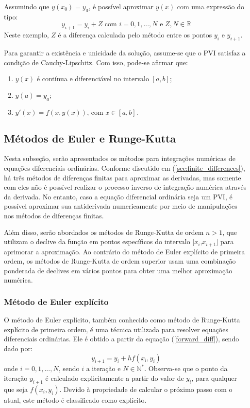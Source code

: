 Assumindo que $y(x_0) = y_0$, é possível aproximar $y(x)$ com uma expressão do tipo:
\begin{equation*}
y_{i+1} = y_i + Z \text{ com } i = 0, 1, ..., N \text{ e } Z, N \in \mathbb{R}
\end{equation*}
Neste exemplo, $Z$ é a diferença calculada pelo método entre os pontos $y_i$ e $y_{i+1}$.

Para garantir a existência e unicidade da solução, assume-se que o PVI satisfaz a condição de Cauchy-Lipschitz. Com isso, pode-se afirmar que:
\begin{enumerate}
\item $y(x)$ é contínua e diferenciável no intervalo $[a, b]$;
\item $y(a) = y_a$;
\item $y'(x) = f(x, y(x))$, com $x \in [a, b]$.
\end{enumerate}

\subsection{Métodos de Euler e Runge-Kutta}\label{sec:ivp_methods}
Nesta subseção, serão apresentados os métodos para integrações numéricas de equações diferenciais ordinárias. Conforme discutido em (\ref{sec:finite_differences}), há três métodos de diferenças finitas para aproximar as derivadas, mas somente com eles não é possível realizar o processo inverso de integração numérica através da derivada. No entanto, caso a equação diferencial ordinária seja um PVI, é possível aproximar sua antiderivada numericamente por meio de manipulações nos métodos de diferenças finitas.

Além disso, serão abordados os métodos de Runge-Kutta de ordem $n>1$, que utilizam o declive da função em pontos específicos do intervalo [$x_i$,$x_{i+1}$] para aprimorar a aproximação. Ao contrário do método de Euler explícito de primeira ordem, os métodos de Runge-Kutta de ordem superior usam uma combinação ponderada de declives em vários pontos para obter uma melhor aproximação numérica. 


\subsubsection{Método de Euler explícito}\label{sec:explicit_euler}

O método de Euler explícito, também conhecido como método de Runge-Kutta explícito de primeira ordem, é uma técnica utilizada para resolver equações diferenciais ordinárias. Ele é obtido a partir da equação (\ref{forward_diff}), sendo dado por:
\begin{equation}\label{explicit_euler}
y_{i+1}= y_{i} + h f(x_i, y_i)
\end{equation}
onde $i = 0, 1,...,N$, sendo $i$ a iteração e $N \in \mathbb{N}^*$. Observa-se que o ponto da iteração $y_{i+1}$ é calculado explicitamente a partir do valor de $y_i$, para qualquer que seja $f(x_i, y_i)$. Devido à propriedade de calcular o próximo passo com o atual, este método é classificado como explícito.


